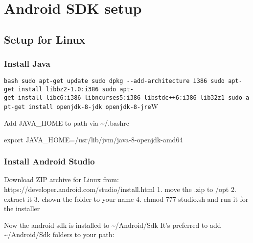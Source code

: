\documentclass[]{article}
\date{}
\newenvironment{Shaded}{}{}
\newcommand{\VariableTok}[1]{\textcolor[rgb]{0.10,0.09,0.49}{#1}}
\newcommand{\BuiltInTok}[1]{#1}
\newcommand{\NormalTok}[1]{#1}
\begin{document}
\section{Android SDK setup}\label{android-sdk-setup}

\subsection{Setup for Linux}\label{setup-for-linux}

\subsubsection{Install Java}\label{install-java}

\texttt{bash\ sudo\ apt-get\ update\ sudo\ dpkg\ -\/-add-architecture\ i386\ sudo\ apt-get\ install\ libbz2-1.0:i386\ sudo\ apt-get\ install\ libc6:i386\ libncurses5:i386\ libstdc++6:i386\ lib32z1\ sudo\ apt-get\ install\ openjdk-8-jdk\ openjdk-8-jre}W

Add JAVA\_HOME to path via \textasciitilde{}/.bashrc

\begin{Shaded}
\begin{Highlighting}[]
\BuiltInTok{export} \VariableTok{JAVA_HOME=}\NormalTok{/usr/lib/jvm/java-8-openjdk-amd64}
\end{Highlighting}
\end{Shaded}

\subsubsection{Install Android Studio}\label{install-android-studio}

Download ZIP archive for Linux from:
https://developer.android.com/studio/install.html 1. move the .zip to
/opt 2. extract it 3. chown the folder to your name 4. chmod 777
studio.sh and run it for the installer

Now the android sdk is installed to \textasciitilde{}/Android/Sdk It's
preferred to add \textasciitilde{}/Android/Sdk folders to your path:

\begin{Shaded}
\end{Shaded}
\end{document}
